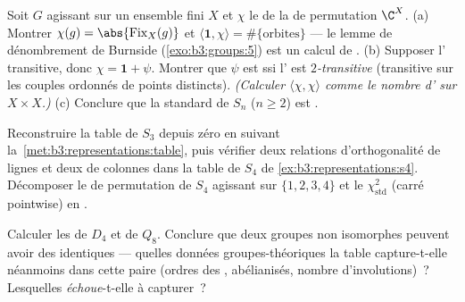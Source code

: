 \begin{exercise}[$\star$]\label{exo:b3:representations:2}
Soit $G$ agissant sur un ensemble fini $X$ et $\chi$ le
 de la  de permutation $\C^X$.
(a) Montrer $\chi(g) = \abs{\operatorname{Fix}_X(g)}$ et
$\langle \mathbf 1, \chi\rangle = \#\{\text{orbites}\}$ --- le
lemme de dénombrement de Burnside (\cref{exo:b3:groups:5}) est
un calcul de .
(b) Supposer l' transitive, donc $\chi = \mathbf 1 +
\psi$. Montrer que $\psi$ est  ssi l' est
\emph{$2$-transitive} (transitive sur les couples ordonnés de
points distincts). \emph{(Calculer $\langle\chi,\chi\rangle$
comme le nombre d' sur $X \times X$.)}
(c) Conclure que la  standard de $S_n$ ($n \geq
2$) est .
\end{exercise}

\begin{exercise}[$\star$]\label{exo:b3:representations:3}
Reconstruire la table de $S_3$ depuis zéro en suivant
la~\cref{met:b3:representations:table}, puis vérifier deux
relations d'orthogonalité de lignes et deux de colonnes dans la
table de $S_4$ de \cref{ex:b3:representations:s4}. Décomposer
le  de permutation de $S_4$ agissant sur $\{1,2,3,4\}$
et le  $\chi_{\mathrm{std}}^2$ (carré pointwise) en
.
\end{exercise}

\begin{exercise}[$\star\star$]\label{exo:b3:representations:4}
Calculer les  de $D_4$ et de $Q_8$.
Conclure que deux groupes non isomorphes peuvent avoir des
 identiques --- quelles données
groupes-théoriques la table capture-t-elle néanmoins dans cette
paire (ordres des , abélianisés, nombre d'involutions)~?
Lesquelles \emph{échoue}-t-elle à capturer~?
\end{exercise}


